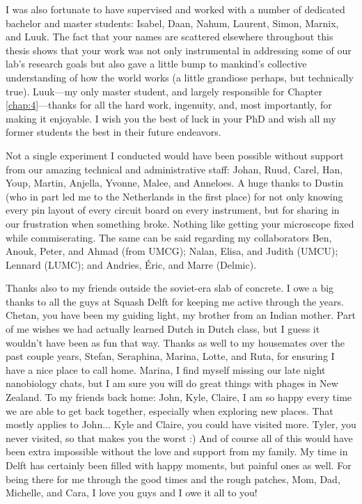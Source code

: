 I was also fortunate to have supervised and worked with a number of dedicated bachelor and master students: Isabel, Daan, Nahum, Laurent, Simon, Marnix, and Luuk. The fact that your names are scattered elsewhere throughout this thesis shows that your work was not only instrumental in addressing some of our lab’s research goals but also gave a little bump to mankind’s collective understanding of how the world works (a little grandiose perhaps, but technically true). Luuk---my only master student, and largely responsible for Chapter \ref{chap:4}---thanks for all the hard work, ingenuity, and, most importantly, for making it enjoyable. I wish you the best of luck in your PhD and wish all my former students the best in their future endeavors. 

Not a single experiment I conducted would have been possible without support from our amazing technical and administrative staff: Johan, Ruud, Carel, Han, Youp, Martin, Anjella, Yvonne, Malee, and Anneloes. A huge thanks to Dustin (who in part led me to the Netherlands in the first place) for not only knowing every pin layout of every circuit board on every instrument, but for sharing in our frustration when something broke. Nothing like getting your microscope fixed while commiserating.
The same can be said regarding my collaborators Ben, Anouk, Peter, and Ahmad (from UMCG); Nalan, Elisa, and Judith (UMCU); Lennard (LUMC); and Andries, \'Eric, and Marre (Delmic).

Thanks also to my friends outside the soviet-era slab of concrete. I owe a big thanks to all the guys at Squash Delft for keeping me active through the years. Chetan, you have been my guiding light, my brother from an Indian mother. Part of me wishes we had actually learned Dutch in Dutch class, but I guess it wouldn’t have been as fun that way.
Thanks as well to my housemates over the past couple years, Stefan, Seraphina, Marina, Lotte, and Ruta, for ensuring I have a nice place to call home. Marina, I find myself missing our late night nanobiology chats, but I am sure you will do great things with phages in New Zealand.
To my friends back home: John, Kyle, Claire, I am so happy every time we are able to get back together, especially when exploring new places. That mostly applies to John... Kyle and Claire, you could have visited more. Tyler, you never visited, so that makes you the worst :)
And of course all of this would have been extra impossible without the love and support from my family. My time in Delft has certainly been filled with happy moments, but painful ones as well. For being there for me through the good times and the rough patches, Mom, Dad, Michelle, and Cara, I love you guys and I owe it all to you!
